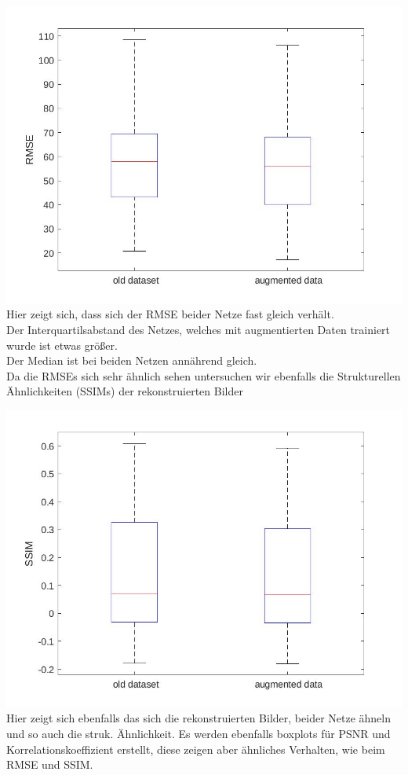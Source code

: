 \documentclass[8pt,a4paper]{article}
\begin{document}
\includegraphics[scale=0.2]{boxplotRMSE.jpg}
\\
Hier zeigt sich, dass sich der RMSE beider Netze fast gleich verhält.\\
Der Interquartilsabstand des Netzes, welches mit augmentierten Daten trainiert wurde ist etwas größer.\\
Der Median ist bei beiden Netzen annährend gleich.
\\
Da die RMSEs sich sehr ähnlich sehen untersuchen wir ebenfalls die Strukturellen Ähnlichkeiten (SSIMs) der rekonstruierten Bilder

\includegraphics[scale=0.2]{boxplotSSIM.jpg}
\\
Hier zeigt sich ebenfalls das sich die rekonstruierten Bilder, beider Netze ähneln und so auch die struk. Ähnlichkeit.
Es werden ebenfalls boxplots für PSNR und Korrelationskoeffizient erstellt, diese zeigen aber ähnliches Verhalten, wie beim RMSE und SSIM.\\
\end{document}
